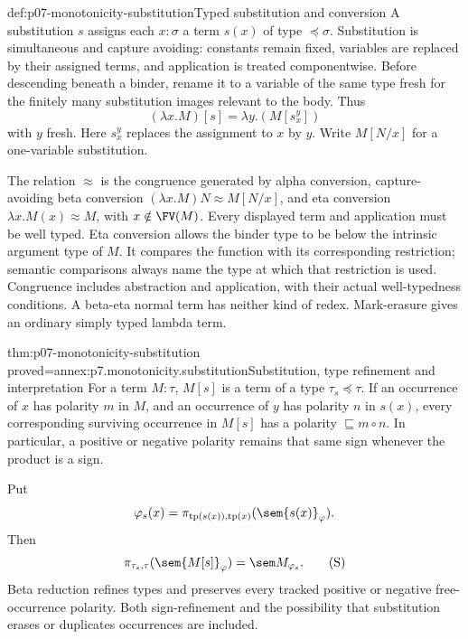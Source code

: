 \begin{hbdefinition}{def:p07-monotonicity-substitution}{Typed substitution and conversion}
A substitution \(s\) assigns each \(x:\sigma\) a term \(s(x)\) of type
\(\preceq\sigma\). Substitution is simultaneous and capture avoiding:
constants remain fixed, variables are replaced by their assigned terms,
and application is treated componentwise. Before descending beneath a
binder, rename it to a variable of the same type fresh for the finitely
many substitution images relevant to the body. Thus
\[
 (\lambda x.M)[s]=\lambda y.(M[s_x^y])
\]
with \(y\) fresh. Here \(s_x^y\) replaces the assignment to \(x\) by \(y\).
Write \(M[N/x]\) for a one-variable substitution.

The relation \(\approx\) is the congruence generated by alpha conversion,
capture-avoiding beta conversion
\((\lambda x.M)N\approx M[N/x]\), and eta conversion
\(\lambda x.M(x)\approx M\), with \(x\notin\FV(M)\).
Every displayed term and application must be well typed. Eta conversion
allows the binder type to be below the intrinsic argument type of \(M\).
It compares the function with its corresponding restriction; semantic
comparisons always name the type at which that restriction is used.
Congruence includes abstraction and application, with their actual
well-typedness conditions. A beta-eta normal term has neither kind of
redex. Mark-erasure gives an ordinary simply typed lambda term.
\end{hbdefinition}

\begin{hblemma}{thm:p07-monotonicity-substitution}
 {proved=annex:p7.monotonicity.substitution}{Substitution, type refinement and interpretation}
For a term \(M:\tau\), \(M[s]\) is a term of a type
\(\tau_s\preceq\tau\). If an occurrence of \(x\) has polarity \(m\) in
\(M\), and an occurrence of \(y\) has polarity \(n\) in \(s(x)\), every
corresponding surviving occurrence in \(M[s]\) has a polarity
\(\sqsubseteq m\circ n\).
In particular, a positive or negative polarity remains that same sign
whenever the product is a sign.

Put
\[
 \varphi_s(x)=
 \pi_{\operatorname{tp}(s(x)),\operatorname{tp}(x)}
       (\sem{s(x)}_\varphi).
\]
Then
\[
 \pi_{\tau_s,\tau}(\sem{M[s]}_\varphi)=\sem M_{\varphi_s}.
 \tag{S}
\]
Beta reduction refines types and preserves every tracked positive or
negative free-occurrence polarity. Both sign-refinement and the
possibility that substitution erases or duplicates occurrences are included.
\end{hblemma}

